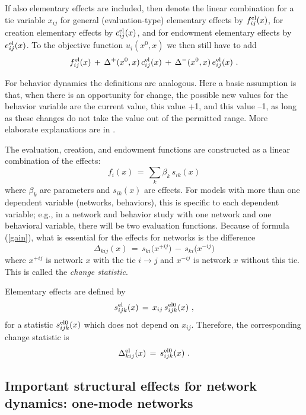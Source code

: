\documentclass[a4paper,fleqn,11pt]{article}
\newcommand{\+}{\, + \,}
\begin{document}
If also elementary effects are included, then denote the linear combination
for a tie variable $x_{ij}$
for general (evaluation-type) elementary effects by  $f^{\rm{el}}_{ij}(x)$, for creation
elementary effects by  $c^{\rm{el}}_{ij}(x)$, and for endowment elementary effects
by  $e^{\rm{el}}_{ij}(x)$.
To the objective function $ u_i(x^0, x)$ we then still have to add
\[
     f^{\rm{el}}_{ij}(x) \,+\,   \Delta^+(x^0, x)\, c^{\rm{el}}_{ij}(x)
                   \,+\,  \Delta^-(x^0, x)\,e^{\rm{el}}_{ij}(x) \ .
\]

For behavior dynamics the definitions are analogous.
Here a basic assumption is that, when there is an opportunity for change,
the possible new values for the behavior variable are the current
value, this value +1, and this value --1, as long as these changes
do not take the value out of the permitted range.
More elaborate explanations are in
\citep*{SnijdersEA07, SnijdersEA10b, SteglichEA10, VeenstraEtAl2013}.

The evaluation, creation, and endowment functions are constructed as a
linear combination of the effects:
\begin{equation}
f_i(x) \, = \, \sum_k \beta_k \, s_{ik}(x)
\end{equation}
where $\beta_k$ are parameters and $s_{ik}(x)$ are effects.
For models with more than one dependent variable (networks, behaviors),
this is specific to each dependent variable; e.g., in a network and behavior
study with one network and one behavioral variable, there will be two evaluation
functions.
Because of formula (\ref{gain}), what is essential for the effects for networks
is the difference
\begin{equation}
   \Delta_{kij} (x) \,=\,  s_{ki}\big(x^{+ij}\big) \, - \,  s_{ki}\big(x^{-ij}\big)  \label{changestat0}
\end{equation}
where $x^{+ij}$ is network $x$ with the tie $i \rightarrow j$
and $x^{-ij}$ is network $x$ without this tie.
This is called the \emph{change statistic}.

Elementary effects are defined by
\[
    s^{\rm el}_{ijk}(x) \, = \, x_{ij}\,s^{\rm el0}_{ijk}(x) \ ,
\]
for a statistic $s^{\rm el0}_{ijk}(x)$ which does not depend on $x_{ij}$. Therefore,
the corresponding change statistic is
\[
    \Delta^{\rm el}_{kij} (x) \,=\, s^{\rm el0}_{ijk}(x) \ .
\]




\subsection{Important structural effects for network dynamics:
           \protect\newline one-mode networks}
\label{S_imp_str1}
\end{document}

